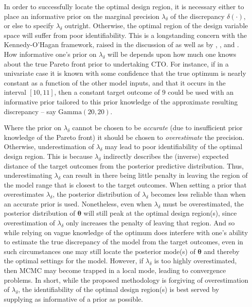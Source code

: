 \documentclass[12pt]{article}
\begin{document}
%
In order to successfully locate the optimal design region, it is necessary either to place an informative prior on the marginal precision $\lambda_\delta$ of the discrepancy $\delta(\cdot)$, or else to specify $\lambda_\delta$ outright. 
%
Otherwise, the optimal region of the design variable space will suffer from poor identifiability.
%
This is a longstanding concern with the Kennedy-O'Hagan framework, raised in the discussion of \cite{Kennedy2001} as well as by \cite{Bayarri2007}, \cite{Tuo2015}, and \cite{Plumlee2017}.
%
How informative one's prior on $\lambda_\delta$ will be depends upon how much one knows about the true Pareto front prior to undertaking CTO.
%
For instance, if in a univariate case it is known with some confidence that the true optimum is nearly constant as a function of the other model inputs, and that it occurs in the interval $[10,11]$, then a constant target outcome of $9$ could be used with an informative prior tailored to this prior knowledge of the approximate resulting discrepancy -- say $\mathrm{Gamma}(20,20)$.
%

Where the prior on $\lambda_\delta$ cannot be chosen to be \emph{accurate} (due to insufficient prior knowledge of the Pareto front) it should be chosen to \emph{overestimate} the precision.
%
Otherwise, underestimation of $\lambda_\delta$ may lead to poor identifiability of the optimal design region.
%
This is because $\lambda_\delta$ indirectly describes the (inverse) expected distance of the target outcomes from the posterior predictive distribution.
%
Thus, underestimating $\lambda_\delta$ can result in there being little penalty in leaving the region of the model range that is closest to the target outcomes.
%
When setting a prior that overestimates $\lambda_\delta$, the posterior distribution of $\lambda_\delta$ becomes less reliable than when an accurate prior is used.
%
Nonetheless, even when $\lambda_\delta$ must be overestimated, the posterior distribution of $\boldsymbol \theta$ will still peak at the optimal design region(s), since overestimation of $\lambda_\delta$ only increases the penalty of leaving that region.
%
And so while relying on vague knowledge of the optimum does interfere with one's ability to estimate the true discrepancy of the model from the target outcomes, even in such circumstances one may still locate the posterior mode(s) of $\boldsymbol \theta$ and thereby the optimal settings for the model.
However, if $\lambda_\delta$ is too highly overestimated, then MCMC may become trapped in a local mode, leading to convergence problems. 
%
In short, while the proposed methodology is forgiving of overestimation of $\lambda_\delta$, the identifiability of the optimal design region(s) is best served by supplying as informative of a prior as possible. 
\end{document}
